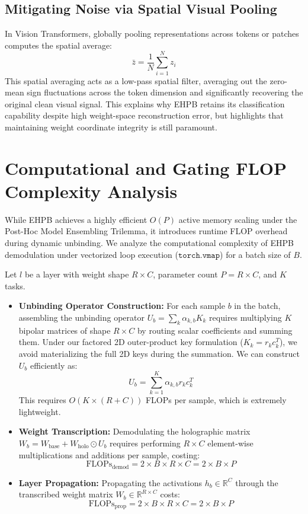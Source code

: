\documentclass{article}
\theoremstyle{plain}
\theoremstyle{definition}
\theoremstyle{remark}
\begin{document}
\subsection{Mitigating Noise via Spatial Visual Pooling}
In Vision Transformers, globally pooling representations across tokens or patches computes the spatial average:
\begin{equation}
\bar{z} = \frac{1}{N} \sum_{i=1}^N z_i
\end{equation}
This spatial averaging acts as a low-pass spatial filter, averaging out the zero-mean sign fluctuations across the token dimension and significantly recovering the original clean visual signal. This explains why EHPB retains its classification capability despite high weight-space reconstruction error, but highlights that maintaining weight coordinate integrity is still paramount.

\section{Computational and Gating FLOP Complexity Analysis}
\label{app:computational_complexity}

While EHPB achieves a highly efficient $O(P)$ active memory scaling under the Post-Hoc Model Ensembling Trilemma, it introduces runtime FLOP overhead during dynamic unbinding. We analyze the computational complexity of EHPB demodulation under vectorized loop execution ($\mathtt{torch.vmap}$) for a batch size of $B$.

Let $l$ be a layer with weight shape $R \times C$, parameter count $P = R \times C$, and $K$ tasks.
\begin{itemize}
\item \textbf{Unbinding Operator Construction:}
For each sample $b$ in the batch, assembling the unbinding operator $U_b = \sum_k \alpha_{k, b} K_k$ requires multiplying $K$ bipolar matrices of shape $R \times C$ by routing scalar coefficients and summing them. Under our factored 2D outer-product key formulation ($K_k = r_k c_k^T$), we avoid materializing the full 2D keys during the summation. We can construct $U_b$ efficiently as:
\begin{equation}
U_b = \sum_{k=1}^K \alpha_{k, b} r_k c_k^T
\end{equation}
This requires $O(K \times (R + C))$ FLOPs per sample, which is extremely lightweight.
\item \textbf{Weight Transcription:}
Demodulating the holographic matrix $W_b = W_{\text{base}} + W_{\text{holo}} \odot U_b$ requires performing $R \times C$ element-wise multiplications and additions per sample, costing:
\begin{equation}
\text{FLOPs}_{\text{demod}} = 2 \times B \times R \times C = 2 \times B \times P
\end{equation}
\item \textbf{Layer Propagation:}
Propagating the activations $h_b \in \mathbb{R}^C$ through the transcribed weight matrix $W_b \in \mathbb{R}^{R \times C}$ costs:
\begin{equation}
\text{FLOPs}_{\text{prop}} = 2 \times B \times R \times C = 2 \times B \times P
\end{equation}
\end{itemize}
\end{document}
